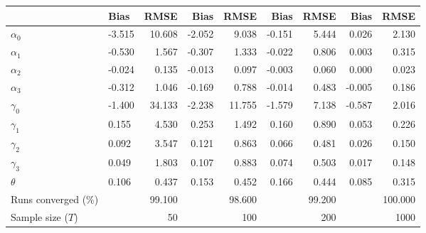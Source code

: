 
\begin{tabular}[t]{llrrrrrrr}
\toprule
  & Bias & RMSE & Bias & RMSE & Bias & RMSE & Bias & RMSE\\
\midrule
$\alpha_{0}$ & -3.515 & 10.608 & -2.052 & 9.038 & -0.151 & 5.444 & 0.026 & 2.130\\
$\alpha_{1}$ & -0.530 & 1.567 & -0.307 & 1.333 & -0.022 & 0.806 & 0.003 & 0.315\\
$\alpha_{2}$ & -0.024 & 0.135 & -0.013 & 0.097 & -0.003 & 0.060 & 0.000 & 0.023\\
$\alpha_{3}$ & -0.312 & 1.046 & -0.169 & 0.788 & -0.014 & 0.483 & -0.005 & 0.186\\
$\gamma_{0}$ & -1.400 & 34.133 & -2.238 & 11.755 & -1.579 & 7.138 & -0.587 & 2.016\\
$\gamma_{1}$ & 0.155 & 4.530 & 0.253 & 1.492 & 0.160 & 0.890 & 0.053 & 0.226\\
$\gamma_{2}$ & 0.092 & 3.547 & 0.121 & 0.863 & 0.066 & 0.481 & 0.026 & 0.150\\
$\gamma_{3}$ & 0.049 & 1.803 & 0.107 & 0.883 & 0.074 & 0.503 & 0.017 & 0.148\\
$\theta$ & 0.106 & 0.437 & 0.153 & 0.452 & 0.166 & 0.444 & 0.085 & 0.315\\
Runs converged (\%) &  & 99.100 &  & 98.600 &  & 99.200 &  & 100.000\\
Sample size ($T$) &  & 50 &  & 100 &  & 200 &  & 1000\\
\bottomrule
\end{tabular}
